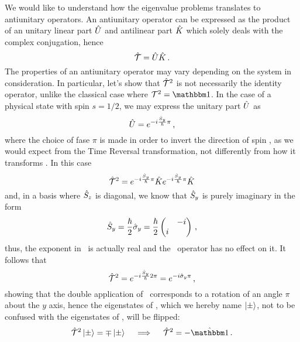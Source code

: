             We would like to understand how the eigenvalue problems translates to antiunitary operators. An antiunitary operator can be expressed \cite{Sakurai2020-pu} as the product of an unitary linear part $\hat{U}$ and antilinear part $\hat{K}$ which solely deals with the complex conjugation, hence
            \begin{equation}
                \label{eq:antiunitary-operator}
                \mathcal{\hat{T}} = \hat{U}\hat{K}
                \,\text{.}
            \end{equation}
            The properties of an antiunitary operator may vary depending on the system in consideration. In particular, let's show that $\mathcal{\hat{T}}^2$ is not necessarily the identity operator, unlike the classical case where $\mcT^2 = \idM$. In the case of a physical state with spin $s = 1/2$, we may express the unitary part $\hat{U}$ as
            \begin{equation*}
                \hat{U} = e^{-i \frac{\hat{S}_y}{\hbar} \pi}
                \,\text{,}
            \end{equation*}
            where the choice of fase $\pi$ is made in order to invert the direction of spin \hvS, as we would expect from the Time Reversal transformation, not differently from how it transforms \hvp. In this case
            \begin{equation*}
                \mathcal{\hat{T}}^2 = e^{-i \frac{\hat{S}_y}{\hbar} \pi} \hat{K} e^{-i \frac{\hat{S}_y}{\hbar} \pi} \hat{K}
            \end{equation*}
            and, in a basis where $\hat{S}_z$ is diagonal, we know that $\hat{S}_y$ is purely imaginary in  the form
            \begin{equation*}
                \hSy
                = \frac{\hbar}{2} \togglehat{\sigma}_y
                = \frac{\hbar}{2} \pmqty{\admat{-i,i}}
                \mycomma
            \end{equation*}
            thus, the exponent in \hU\ is actually real and the \hK\ operator has no effect on it. It follows that
            \begin{equation*}
                \mathcal{\hat{T}}^2
                = e^{-i \frac{\hat{S}_y}{\hbar} 2\pi}
                = e^{-i \hat{\sigma}_y \pi}
                \,\text{,}
            \end{equation*}
            showing that the double application of \hT\ corresponds to a rotation of an angle $\pi$ about the $y$ axis, hence the eigenstates of \hSz, which we hereby name $\ket{\pm}$, not to be confused with the eigenstates of \hP, will be flipped:
            \begin{equation*}
                \hT^2 \ket{\pm} = \mp \ket{\pm}
                \quad\implies\quad
                \hT^2 = -\togglehat{\idM}
                \myperiod
            \end{equation*}

